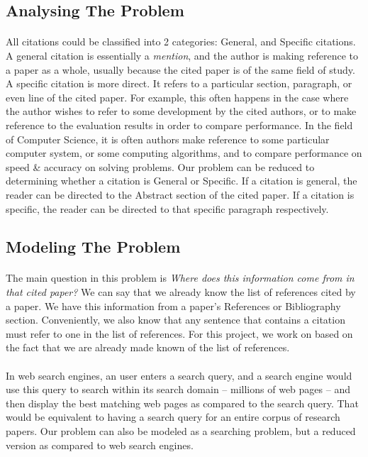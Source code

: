 \documentclass[12 pt]{article}
\begin{document}
\subsection{Analysing The Problem}
\paragraph{}
All citations could be classified into 2 categories: General, and Specific citations. A general citation is essentially a \textit{mention}, and the author is making reference to a paper as a whole, usually because the cited paper is of the same field of study. A specific citation is more direct. It refers to a particular section, paragraph, or even line of the cited paper. For example, this often happens in the case where the author wishes to refer to some development by the cited authors, or to make reference to the evaluation results in order to compare performance. In the field of Computer Science, it is often authors make reference to some particular computer system, or some computing algorithms, and to compare performance on speed \& accuracy on solving problems. Our problem can be reduced to determining whether a citation is General or Specific. If a citation is general, the reader can be directed to the Abstract section of the cited paper. If a citation is specific, the reader can be directed to that specific paragraph respectively.

\subsection{Modeling The Problem}
\paragraph{}
The main question in this problem is \textit{Where does this information come from in that cited paper?}
We can say that we already know the list of references cited by a paper. We have this information from a paper's References or Bibliography section. Conveniently, we also know that any sentence that contains a citation must refer to one in the list of references. For this project, we work on based on the fact that we are already made known of the list of references.

\paragraph{}
In web search engines, an user enters a search query, and a search engine would use this query to search within its search domain -- millions of web pages -- and then display the best matching web pages as compared to the search query. That would be equivalent to having a search query for an entire corpus of research papers. Our problem can also be modeled as a searching problem, but a reduced version as compared to web search engines.
\end{document}
